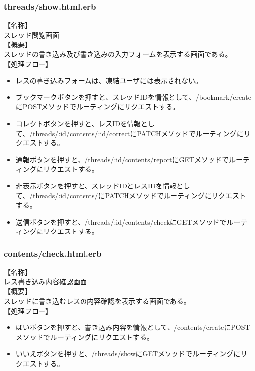 \documentclass[a4j]{jarticle}
\begin{document}
\subsubsection{threads/show.html.erb}
\noindent
【名称】\\
スレッド閲覧画面\\
【概要】\\
スレッドの書き込み及び書き込みの入力フォームを表示する画面である。\\
【処理フロー】
\begin{itemize}
  \item レスの書き込みフォームは、凍結ユーザには表示されない。
  \item ブックマークボタンを押すと、スレッドIDを情報として、/bookmark/createにPOSTメソッドでルーティングにリクエストする。
  \item コレクトボタンを押すと、レスIDを情報として、/threads/:id/contents/:id/correctにPATCHメソッドでルーティングにリクエストする。
  \item 通報ボタンを押すと、/threads/:id/contents/reportにGETメソッドでルーティングにリクエストする。
  \item 非表示ボタンを押すと、スレッドIDとレスIDを情報として、/threads/:id/contents/にPATCHメソッドでルーティングにリクエストする。
  \item 送信ボタンを押すと、/threads/:id/contents/checkにGETメソッドでルーティングにリクエストする。
\end{itemize}

\subsubsection{contents/check.html.erb}
\noindent
【名称】\\
レス書き込み内容確認画面\\
【概要】\\
スレッドに書き込むレスの内容確認を表示する画面である。\\
【処理フロー】
\begin{itemize}
  \item はいボタンを押すと、書き込み内容を情報として、/contents/createにPOSTメソッドでルーティングにリクエストする。
  \item いいえボタンを押すと、/threads/showにGETメソッドでルーティングにリクエストする。
\end{itemize}
\end{document}
